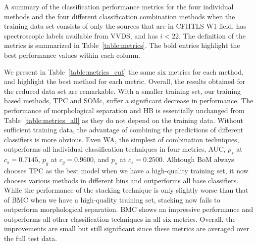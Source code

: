 \documentclass[useAMS,usenatbib]{mn2e}
\begin{document}
\begin{table}
  \caption{A summary of the classification performance metrics
           for the four individual methods
           and the four different classification combination methods
           when the training data set consists of
           only the sources that are in CFHTLS W1 field,
           has spectroscopic labels available from VVDS,
           and has $i < 22$.
           The definition of the metrics is summarized in
           Table~\ref{table:metrics}.
           The bold entries highlight the best performance values
           within each column.}
  \centering
  
  \label{table:metrics_cut}
\end{table}

We present in Table~\ref{table:metrics_cut}
the same six metrics for each method,
and highlight the best method for each metric.
Overall, the results obtained for the reduced data set are remarkable.
With a smaller training set, our training based methods, TPC and SOMc,
suffer a significant decrease in performance.
The performance of morphological separation and HB
is essentially unchanged from Table~\ref{table:metrics_all}
as they do not depend on the training data.
Without sufficient training data,
the advantage of combining the predictions of different classifiers
is more obvious.
Even WA, the simplest of combination techniques, outperforms
all individual classification techniques in four metrics,
AUC, $p_s$ at $c_s=0.7145$, $p_g$ at $c_g=0.9600$, and $p_s$ at $c_s=0.2500$.
Alhtough BoM always chooses TPC as the best model
when we have a high-quality training set,
it now chooses various methods in different bins
and outperforms all base classifiers.
While the performance of the stacking technique is only slightly worse
than that of BMC when we have a high-quality training set,
stacking now fails to outperform morphological separation.
BMC shows an impressive performance and 
outperforms all other classification techniques in all six metrics.
Overall, the improvements are small but still significant
since these metrics are averaged over the full test data.

\end{document}
